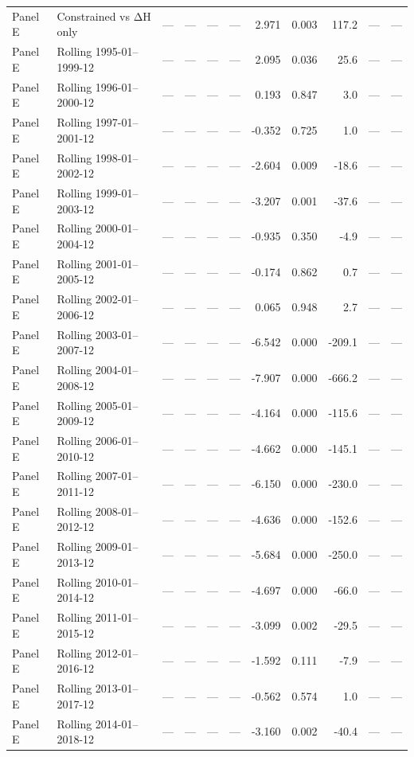 \begin{longtable}{lllrrrrrrrl}
Panel E & Constrained vs ΔH only & — & — & — & — & 2.971 & 0.003 & 117.2 & — & — \\
Panel E & Rolling 1995-01–1999-12 & — & — & — & — & 2.095 & 0.036 & 25.6 & — & — \\
Panel E & Rolling 1996-01–2000-12 & — & — & — & — & 0.193 & 0.847 & 3.0 & — & — \\
Panel E & Rolling 1997-01–2001-12 & — & — & — & — & -0.352 & 0.725 & 1.0 & — & — \\
Panel E & Rolling 1998-01–2002-12 & — & — & — & — & -2.604 & 0.009 & -18.6 & — & — \\
Panel E & Rolling 1999-01–2003-12 & — & — & — & — & -3.207 & 0.001 & -37.6 & — & — \\
Panel E & Rolling 2000-01–2004-12 & — & — & — & — & -0.935 & 0.350 & -4.9 & — & — \\
Panel E & Rolling 2001-01–2005-12 & — & — & — & — & -0.174 & 0.862 & 0.7 & — & — \\
Panel E & Rolling 2002-01–2006-12 & — & — & — & — & 0.065 & 0.948 & 2.7 & — & — \\
Panel E & Rolling 2003-01–2007-12 & — & — & — & — & -6.542 & 0.000 & -209.1 & — & — \\
Panel E & Rolling 2004-01–2008-12 & — & — & — & — & -7.907 & 0.000 & -666.2 & — & — \\
Panel E & Rolling 2005-01–2009-12 & — & — & — & — & -4.164 & 0.000 & -115.6 & — & — \\
Panel E & Rolling 2006-01–2010-12 & — & — & — & — & -4.662 & 0.000 & -145.1 & — & — \\
Panel E & Rolling 2007-01–2011-12 & — & — & — & — & -6.150 & 0.000 & -230.0 & — & — \\
Panel E & Rolling 2008-01–2012-12 & — & — & — & — & -4.636 & 0.000 & -152.6 & — & — \\
Panel E & Rolling 2009-01–2013-12 & — & — & — & — & -5.684 & 0.000 & -250.0 & — & — \\
Panel E & Rolling 2010-01–2014-12 & — & — & — & — & -4.697 & 0.000 & -66.0 & — & — \\
Panel E & Rolling 2011-01–2015-12 & — & — & — & — & -3.099 & 0.002 & -29.5 & — & — \\
Panel E & Rolling 2012-01–2016-12 & — & — & — & — & -1.592 & 0.111 & -7.9 & — & — \\
Panel E & Rolling 2013-01–2017-12 & — & — & — & — & -0.562 & 0.574 & 1.0 & — & — \\
Panel E & Rolling 2014-01–2018-12 & — & — & — & — & -3.160 & 0.002 & -40.4 & — & — \\

\end{longtable}
